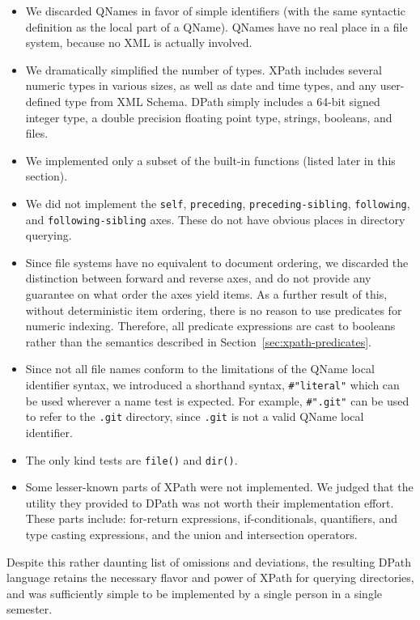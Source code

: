 \documentclass{scrartcl}
\begin{document}
\begin{itemize}
\item We discarded QNames in favor of simple identifiers (with the same
  syntactic definition as the local part of a QName). QNames have no real place
  in a file system, because no XML is actually involved.
\item We dramatically simplified the number of types. XPath includes several
  numeric types in various sizes, as well as date and time types, and any
  user-defined type from XML Schema. DPath simply includes a 64-bit signed
  integer type, a double precision floating point type, strings, booleans, and
  files.
\item We implemented only a subset of the built-in functions (listed later in
  this section).
\item We did not implement the \texttt{self}, \texttt{preceding},
  \texttt{preceding-sibling}, \texttt{following}, and \texttt{following-sibling}
  axes. These do not have obvious places in directory querying.
\item Since file systems have no equivalent to document ordering, we discarded
  the distinction between forward and reverse axes, and do not provide any
  guarantee on what order the axes yield items. As a further result of this,
  without deterministic item ordering, there is no reason to use predicates for
  numeric indexing. Therefore, all predicate expressions are cast to booleans
  rather than the semantics described in Section~\ref{sec:xpath-predicates}.
\item Since not all file names conform to the limitations of the QName local
  identifier syntax, we introduced a shorthand syntax, \texttt{\#"literal"}
  which can be used wherever a name test is expected. For example,
  \texttt{\#".git"} can be used to refer to the \texttt{.git} directory, since
  \texttt{.git} is not a valid QName local identifier.
\item The only kind tests are \texttt{file()} and \texttt{dir()}.
\item Some lesser-known parts of XPath were not implemented. We judged that the
  utility they provided to DPath was not worth their implementation effort.
  These parts include: for-return expressions, if-conditionals, quantifiers, and
  type casting expressions, and the union and intersection operators.
\end{itemize}

Despite this rather daunting list of omissions and deviations, the resulting
DPath language retains the necessary flavor and power of XPath for querying
directories, and was sufficiently simple to be implemented by a single person in
a single semester.
\end{document}
